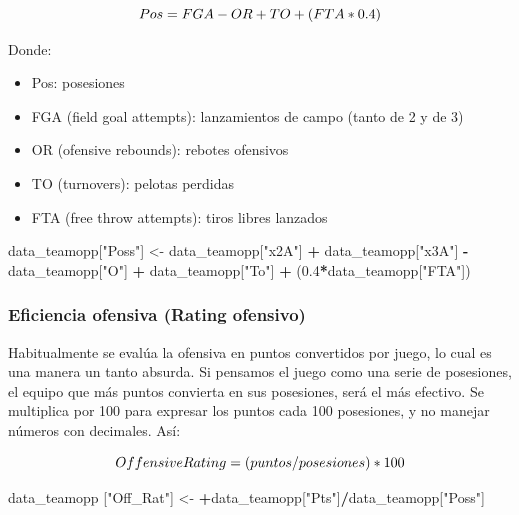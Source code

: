 \documentclass[
]{article}
\newenvironment{Shaded}{\begin{snugshade}}{\end{snugshade}}
\newcommand{\FloatTok}[1]{\textcolor[rgb]{0.00,0.00,0.81}{#1}}
\newcommand{\NormalTok}[1]{#1}
\newcommand{\OperatorTok}[1]{\textcolor[rgb]{0.81,0.36,0.00}{\textbf{#1}}}
\newcommand{\StringTok}[1]{\textcolor[rgb]{0.31,0.60,0.02}{#1}}
\providecommand{\tightlist}{%
  \setlength{\itemsep}{0pt}\setlength{\parskip}{0pt}}
\begin{document}
\[
  \makebox[\linewidth]{$Pos = FGA - OR + TO + (FTA*0.4)$}
\]

Donde:

\begin{itemize}
\tightlist
\item
  Pos: posesiones
\item
  FGA (field goal attempts): lanzamientos de campo (tanto de 2 y de 3)
\item
  OR (ofensive rebounds): rebotes ofensivos
\item
  TO (turnovers): pelotas perdidas
\item
  FTA (free throw attempts): tiros libres lanzados \newline
\end{itemize}

\begin{Shaded}
\begin{Highlighting}[]
\NormalTok{data_teamopp[}\StringTok{"Poss"}\NormalTok{] <-}\StringTok{ }\NormalTok{data_teamopp[}\StringTok{"x2A"}\NormalTok{] }\OperatorTok{+}\StringTok{ }\NormalTok{data_teamopp[}\StringTok{"x3A"}\NormalTok{] }\OperatorTok{-}\StringTok{ }
\StringTok{  }\NormalTok{data_teamopp[}\StringTok{"O"}\NormalTok{] }\OperatorTok{+}\StringTok{ }\NormalTok{data_teamopp[}\StringTok{"To"}\NormalTok{] }\OperatorTok{+}\StringTok{ }\NormalTok{(}\FloatTok{0.4}\OperatorTok{*}\NormalTok{data_teamopp[}\StringTok{"FTA"}\NormalTok{])}
\end{Highlighting}
\end{Shaded}

\hypertarget{eficiencia-ofensiva-rating-ofensivo}{%
\subsubsection{Eficiencia ofensiva (Rating
ofensivo)}\label{eficiencia-ofensiva-rating-ofensivo}}

Habitualmente se evalúa la ofensiva en puntos convertidos por juego, lo
cual es una manera un tanto absurda. Si pensamos el juego como una serie
de posesiones, el equipo que más puntos convierta en sus posesiones,
será el más efectivo. Se multiplica por 100 para expresar los puntos
cada 100 posesiones, y no manejar números con decimales. Así:

\[
  \makebox[\linewidth]{$Offensive Rating = (puntos/posesiones)*100$}
\]

\begin{Shaded}
\begin{Highlighting}[]
\NormalTok{data_teamopp [}\StringTok{"Off_Rat"}\NormalTok{] <-}\StringTok{ }\OperatorTok{+}\NormalTok{data_teamopp[}\StringTok{"Pts"}\NormalTok{]}\OperatorTok{/}\NormalTok{data_teamopp[}\StringTok{"Poss"}\NormalTok{]}
\end{Highlighting}
\end{Shaded}
\end{document}
